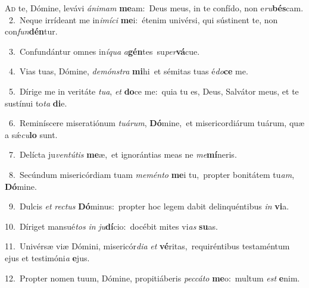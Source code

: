 \lettrine{\initial\textcolor{\initialcolor}{A}}{d} te, Dómine, levávi \textit{á}\-\textit{ni}\textit{mam} \textbf{me}\-am:~\star Deus meus, in te confído, non e\-\textit{ru}\-\textbf{bés}cam.\\
{\numbfont\textcolor{\numbcolor}{~2.}}~Neque irrídeant me in\-\textit{i}\-\textit{mí}\textit{ci} \textbf{me}\-i:~\star étenim univérsi, qui sústinent te, non con\-\textit{fun}\-\textbf{dén}tur.\par
{\numbfont\textcolor{\numbcolor}{~3.}}~Confundántur omnes in\-\textit{í}\-\textit{qua} \textit{a}\-\textbf{gén}tes~\star su\-\textit{per}\-\textbf{vá}cue.\par
{\numbfont\textcolor{\numbcolor}{~4.}}~Vias tuas, Dómine, \textit{de}\-\textit{móns}\textit{tra} \textbf{mi}\-hi~\star et sémitas tuas é\-\textit{do}\-\textbf{ce} me.\par
{\numbfont\textcolor{\numbcolor}{~5.}}~Dírige me in veritáte \textit{tu}\-\textit{a}, \textit{et} \textbf{do}\-ce me:~\star quia tu es, Deus, Salvátor meus, et te sustínui to\textit{ta} \textbf{di}\-e.\par
{\numbfont\textcolor{\numbcolor}{~6.}}~Reminíscere miseratiónum \textit{tu}\-\textit{á}\textit{rum}, \textbf{Dó}\-mine,~\star et misericordiárum tuárum, quæ a sǽ\-\textit{cu}\-\textbf{lo} sunt.\par
{\numbfont\textcolor{\numbcolor}{~7.}}~Delícta ju\-\textit{ven}\-\textit{tú}\textit{tis} \textbf{me}\-æ,~\star et ignorántias meas ne \textit{me}\-\textbf{mí}neris.\par
{\numbfont\textcolor{\numbcolor}{~8.}}~Secúndum misericórdiam tuam \textit{me}\-\textit{mén}\textit{to} \textbf{me}\-i tu,~\star propter bonitátem tu\-\textit{am}\-, \textbf{Dó}\-mine.\par
{\numbfont\textcolor{\numbcolor}{~9.}}~Dulcis \textit{et} \textit{rec}\-\textit{tus} \textbf{Dó}\-minus:~\star propter hoc legem dabit delinquéntibus \textit{in} \textbf{vi}\-a.\par
{\numbfont\textcolor{\numbcolor}{10.}}~Díriget mansué\textit{tos} \textit{in} \textit{ju}\-\textbf{dí}cio:~\star docébit mites vi\textit{as} \textbf{su}\-as.\par
{\numbfont\textcolor{\numbcolor}{11.}}~Univérsæ viæ Dómini, misericór\-\textit{di}\-\textit{a} \textit{et} \textbf{vé}\-ritas,~\star requiréntibus testaméntum ejus et testimóni\textit{a} \textbf{e}\-jus.\par
{\numbfont\textcolor{\numbcolor}{12.}}~Propter nomen tuum, Dómine, propitiáberis \textit{pec}\-\textit{cá}\textit{to} \textbf{me}\-o:~\star multum \textit{est} \textbf{e}\-nim.\par
